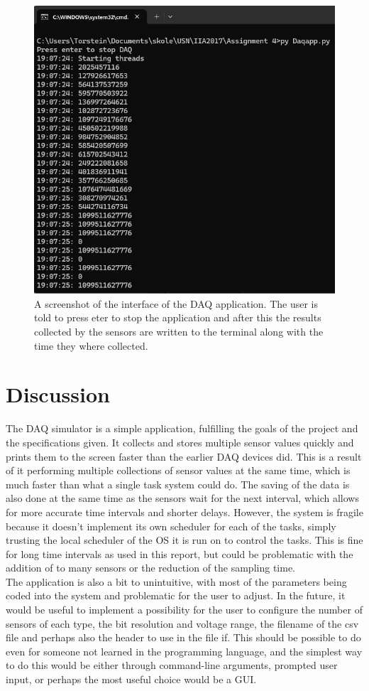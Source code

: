 \documentclass[12pt, A4paper, english]{book}
\begin{document}
		\begin{figure}
\centering
\includegraphics[width=\linewidth]{DAQterminal}
\caption{A screenshot of the interface of the DAQ application. The user is told to press eter to stop the application and after this the results collected by the sensors are written to the terminal along with the time they where collected.}
\label{im:daqterminal}
		\end{figure}
	\chapter{Discussion}
The DAQ simulator is a simple application, fulfilling the goals of the project and the specifications given. It collects and stores multiple sensor values quickly and prints them to the screen faster than the earlier DAQ devices did. This is a result of it performing multiple collections of sensor values at the same time, which is much faster than what a single task system could do. The saving of the data is also done at the same time as the sensors wait for the next interval, which allows for more accurate time intervals and shorter delays. However, the system is fragile because it doesn't implement its own scheduler for each of the tasks, simply trusting the local scheduler of the OS it is run on to control the tasks. This is fine for long time intervals as used in this report, but could be problematic with the addition of to many sensors or the reduction of the sampling time. \\
The application is also a bit to unintuitive, with most of the parameters being coded into the system and problematic for the user to adjust. In the future, it would be useful to implement a possibility for the user to configure the number of sensors of each type, the bit resolution and voltage range, the filename of the csv file and perhaps also the header to use in the file if. This should be possible to do even for someone not learned in the programming language, and the simplest way to do this would be either through command-line arguments, prompted user input, or perhaps the most useful choice would be a GUI.
\end{document}
